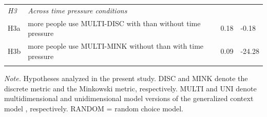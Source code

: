 \documentclass[a4paper,man,natbib]{apa6}
\begin{document}
\begin{table}
\begin{center}
\begin{threeparttable}
\begin{tabular*}{\textwidth}{lp{55mm}p{100mm}ll}
\midrule
\multicolumn{1}{l}{\emph{H3}} & \multicolumn{1}{l}{\emph{Across time pressure conditions}} \\
\addlinespace
H3a & \multicolumn{2}{p{150mm}}{more people use MULTI-DISC with than without time pressure} & 0.18 & -0.18\\
\addlinespace
H3b & \multicolumn{2}{p{150mm}}{more people use MULTI-MINK without than with time pressure} & 0.09 & -24.28\\
\bottomrule
\addlinespace
\end{tabular*}
\begin{tablenotes}[para]
\textit{Note.} Hypotheses analyzed in the present study. DISC and MINK denote the discrete metric and the Minkowski metric, respectively. MULTI and UNI denote multidimensional and unidimensional model versions of the generalized context model \citep{nosofsky1989further}, respectively. RANDOM = random choice model.
\end{tablenotes}
\end{threeparttable}
\end{center}
\end{table}
\vspace{\baselineskip}
\end{document}
